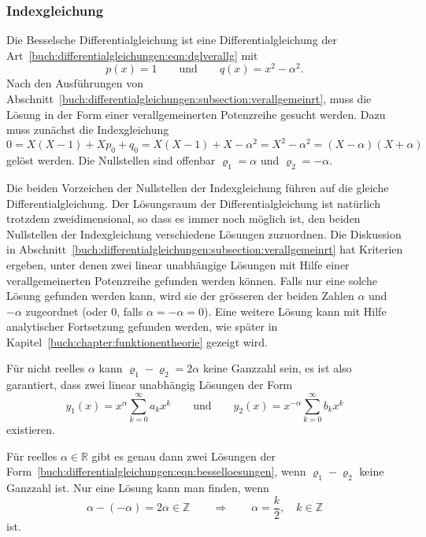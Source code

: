 %
%
\subsubsection{Indexgleichung}
Die Besselsche Differentialgleichung ist eine Differentialgleichung
der Art~\eqref{buch:differentialgleichungen:eqn:dglverallg} mit
\[
p(x) = 1
\qquad\text{und}\qquad
q(x) = x^2-\alpha^2.
\]
Nach den Ausführungen von
Abschnitt~\ref{buch:differentialgleichungen:subsection:verallgemeinrt},
muss die Lösung in der Form einer verallgemeinerten Potenzreihe 
gesucht werden.
Dazu muss zunächst die Indexgleichung
\[
0
=
X(X-1) + Xp_0 + q_0
=
X(X-1) + X - \alpha^2
=
X^2-\alpha^2
=
(X-\alpha)(X+\alpha)
\]
gelöst werden.
Die Nullstellen sind offenbar $\varrho_1=\alpha$ und $\varrho_2=-\alpha$.

Die beiden Vorzeichen der Nullstellen der Indexgleichung führen
auf die gleiche Differentialgleichung.
Der Lösungsraum der Differentialgleichung ist natürlich trotzdem
zweidimensional, so dass es immer noch möglich ist, den
beiden Nullstellen der Indexgleichung verschiedene Lösungen
zuzuordnen.
Die Diskussion in
Abschnitt~\ref{buch:differentialgleichungen:subsection:verallgemeinrt}
hat Kriterien ergeben, unter denen zwei linear unabhängige Lösungen
mit Hilfe einer verallgemeinerten Potenzreihe gefunden werden können.
Falls nur eine solche Lösung gefunden werden kann, wird sie der grösseren
der beiden Zahlen $\alpha$ und $-\alpha$ zugeordnet
(oder $0$, falls $\alpha=-\alpha=0$).
Eine weitere Lösung kann mit Hilfe analytischer Fortsetzung gefunden werden,
wie später in Kapitel~\ref{buch:chapter:funktionentheorie} gezeigt wird.

Für nicht reelles $\alpha$ kann $\varrho_1-\varrho_2=2\alpha$ keine 
Ganzzahl sein, es ist also garantiert, dass zwei linear unabhängig
Lösungen der Form
\begin{equation}
y_1(x) = x^\alpha\sum_{k=0}^\infty a_kx^k
\qquad\text{und}\qquad
y_2(x) = x^{-\alpha}\sum_{k=0}^\infty b_kx^k
\label{buch:differentialgleichungen:eqn:besselloesungen}
\end{equation}
existieren.

Für reelles $\alpha\in\mathbb{R}$ gibt es genau dann zwei Lösungen der
Form~\eqref{buch:differentialgleichungen:eqn:besselloesungen},
wenn $\varrho_1-\varrho_2$ keine Ganzzahl ist.
Nur eine Lösung kann man finden, wenn 
\[
\alpha-(-\alpha)=2\alpha \in \mathbb{Z}
\qquad\Rightarrow\qquad
\alpha = \frac{k}{2},\quad k\in\mathbb{Z}
\]
ist.

%
%
